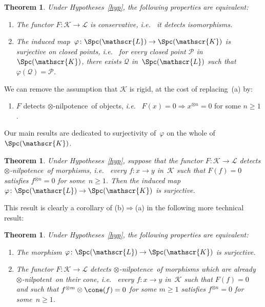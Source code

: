 \documentclass{amsart}
\numberwithin{equation}{section}
\newtheorem{Thm}[equation]{Theorem}
\theoremstyle{remark}
\begin{document}
\begin{Thm}
\label{thm:surj-closed}Under Hypotheses~\ref{hyp}, the following properties are equivalent:
\begin{enumerate}[\rm(a)]
\item
The functor $F\colon{\mathscr{{K}}}\to {\mathscr{{L}}}$ is conservative, {{\sl i.e.}\ } it detects isomorphisms.
\smallbreak
\item
The induced map~$\varphi\colon{\Spc({\mathscr{L}})}\to {\Spc({\mathscr{K}})}$ is surjective on closed points, {{\sl i.e.}\ } for every closed point ${{\mathscr{{P}}}}$ in~${\Spc({\mathscr{K}})}$, there exists ${{\mathscr{{Q}}}}$ in~${\Spc({\mathscr{L}})}$ such that $\varphi({{\mathscr{{Q}}}})={{\mathscr{{P}}}}$.
\end{enumerate}
\end{Thm}

We can remove the assumption that ${\mathscr{{K}}}$ is rigid, at the cost of replacing~(a) by:
\begin{enumerate}[\rm(a')]
\item
\label{it:a'}$F$ detects {$\otimes$-nilpotence}\ of objects, {{\sl i.e.}\ } $F(x)=0 {\Rightarrow} x{^{\otimes {n}}}=0$ for some $n\ge 1$.
\end{enumerate}

\medbreak

Our main results are dedicated to surjectivity of~$\varphi$ on the whole of~${\Spc({\mathscr{K}})}$.

\begin{Thm}
\label{thm:surj-nil}Under Hypotheses~\ref{hyp}, suppose that the functor $F\colon{\mathscr{{K}}}\to {\mathscr{{L}}}$ detects {$\otimes$-nilpotence}\ of morphisms, {{\sl i.e.}\ } every $f\colon x\to y$ in~${\mathscr{{K}}}$ such that $F(f)=0$ satisfies $f{^{\otimes {n}}}=0$ for some~$n\ge1$. Then the induced map~$\varphi\colon{\Spc({\mathscr{L}})}\to {\Spc({\mathscr{K}})}$ is surjective.
\end{Thm}

This result is clearly a corollary of (b)${\Rightarrow}$(a) in the following more technical result:
\begin{Thm}
\label{thm:main}Under Hypotheses~\ref{hyp}, the following properties are equivalent:
\begin{enumerate}[\rm(a)]
\item
The morphism $\varphi\colon{\Spc({\mathscr{L}})}\to {\Spc({\mathscr{K}})}$ is surjective.
\smallbreak
\item
\label{it:nil-cone}The functor $F\colon {\mathscr{{K}}}\to {\mathscr{{L}}}$ detects {$\otimes$-nilpotence}\ of morphisms which are already {$\otimes$-nilpotent}\ on their cone, {{\sl i.e.}\ } every $f\colon x\to y$ in~${\mathscr{{K}}}$ such that $F(f)=0$ and such that $f{^{\otimes {m}}}\otimes\cone(f)=0$ for some $m\ge 1$ satisfies $f{^{\otimes {n}}}=0$ for some~$n\ge1$.
\end{enumerate}
\end{Thm}
\end{document}
